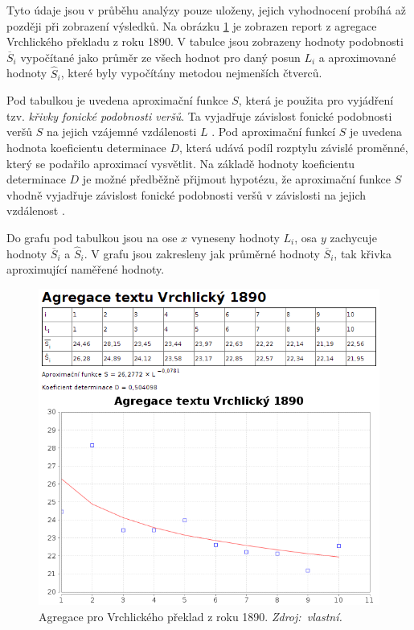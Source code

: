 \documentclass[dp.tex]{subfiles}
\begin{document}
Tyto údaje jsou v průběhu analýzy pouze uloženy, jejich vyhodnocení probíhá až později při zobrazení výsledků. Na obrázku \ref{fig:agregace-vrchlicky-1890} je zobrazen report z agregace Vrchlického překladu z roku 1890. V tabulce jsou zobrazeny hodnoty podobnosti $\overline{S}_i$ vypočítané jako průměr ze všech hodnot pro daný posun $L_i$ a aproximované hodnoty $\hat{S}_i$, které byly vypočítány metodou nejmenších čtverců.

Pod tabulkou je uvedena aproximační funkce $S$, která je použita pro vyjádření tzv. \textit{křivky fonické podobnosti veršů}. Ta vyjadřuje závislost fonické podobnosti veršů $S$ na jejich vzájemné vzdálenosti $L$ \cite[str.~78]{Wimmer2003}. Pod aproximační funkcí $S$ je uvedena hodnota koeficientu determinace $D$, která udává podíl rozptylu závislé proměnné, který se podařilo aproximací vysvětlit. Na základě hodnoty koeficientu determinace $D$ je možné předběžně přijmout hypotézu, že aproximační funkce $S$ vhodně vyjadřuje závislost fonické podobnosti veršů v závislosti na jejich vzdálenost \cite[str.~79]{Wimmer2003}. 

Do grafu pod tabulkou jsou na ose $x$ vyneseny hodnoty $L_i$, osa $y$ zachycuje hodnoty  $\overline{S}_i$ a $\hat{S}_i$. V grafu jsou zakresleny jak průměrné hodnoty $\overline{S}_i$, tak křivka aproximující naměřené hodnoty. 

\begin{figure}[H]
	\centering
	\includegraphics[max width=\textwidth,keepaspectratio=true]{imgs-70-prakticka/aggregation_vrchlicky_1890}
	\caption[Agregace pro Vrchlického překlad z roku 1890]{Agregace pro Vrchlického překlad z roku 1890. \textit{Zdroj:~vlastní.}}
	\label{fig:agregace-vrchlicky-1890}
\end{figure}
\end{document}
